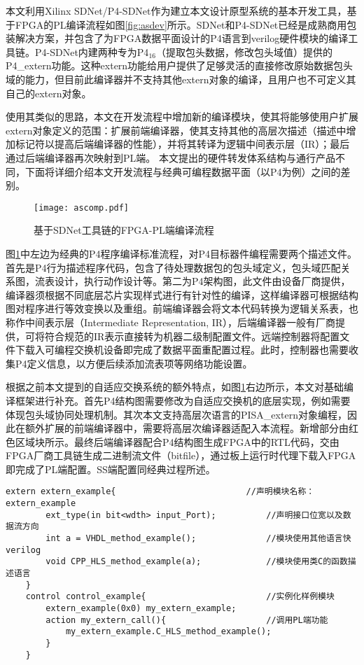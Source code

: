 本文利用Xilinx SDNet/P4-SDNet作为建立本文设计原型系统的基本开发工具，基于FPGA的PL编译流程如图\ref{fig:asdev}所示。SDNet和P4-SDNet已经是成熟商用包装解决方案，并包含了为FPGA数据平面设计的P4语言到verilog硬件模块的编译工具链。P4-SDNet内建两种专为P4$ _{16} $（提取包头数据，修改包头域值）提供的P4\_extern功能。这种extern功能给用户提供了足够灵活的直接修改原始数据包头域的能力，但目前此编译器并不支持其他extern对象的编译，且用户也不可定义其自己的extern对象。

使用其类似的思路，本文在开发流程中增加新的编译模块，使其将能够使用户扩展extern对象定义的范围：扩展前端编译器，使其支持其他的高层次描述（描述中增加标记符以提高后端编译器的性能），并将其转译为逻辑中间表示层（IR）；最后通过后端编译器再次映射到PL端。
本文提出的硬件转发体系结构与通行产品不同，下面将详细介绍本文开发流程与经典可编程数据平面（以P4为例）之间的差别。

\begin{figure}[!ht]
	\centering 
	\vspace{-1.5mm} 
	\texttt{[image: ascomp.pdf]}
	\caption{基于SDNet工具链的FPGA-PL端编译流程} \label{fig:ascomp}
\end{figure}

图\ref{fig:ascomp}中左边为经典的P4程序编译标准流程，对P4目标器件编程需要两个描述文件。首先是P4行为描述程序代码，包含了待处理数据包的包头域定义，包头域匹配关系图，流表设计，执行动作设计等。第二为P4架构图，此文件由设备厂商提供，编译器须根据不同底层芯片实现样式进行有针对性的编译，这样编译器可根据结构图对程序进行等效变换以及重组。前端编译器会将文本代码转换为逻辑关系表，也称作中间表示层（Intermediate Representation, IR），后端编译器一般有厂商提供，可将符合规范的IR表示直接转为机器二级制配置文件。远端控制器将配置文件下载入可编程交换机设备即完成了数据平面重配置过程。此时，控制器也需要收集P4定义信息，以方便后续添加流表项等网络功能设置。

根据之前本文提到的自适应交换系统的额外特点，如图\ref{fig:ascomp}右边所示，本文对基础编译框架进行补充。首先P4结构图需要修改为自适应交换机的底层实现，例如需要体现包头域协同处理机制。其次本文支持高层次语言的PISA\_extern对象编程，因此在额外扩展的前端编译器中，需要将高层次编译器适配入本流程。新增部分由红色区域块所示。最终后端编译器配合P4结构图生成FPGA中的RTL代码，交由FPGA厂商工具链生成二进制流文件（bitfile），通过板上运行时代理下载入FPGA即完成了PL端配置。SS端配置同经典过程所述。

\label{chap433}



{\fontsize{10pt}{0.5\baselineskip}\selectfont
	\begin{lstlisting}[caption={数据平面接口：PL端高层语言描述},label={ascode1}]
	extern extern_example{           				//声明模块名称：extern_example
		ext_type(in bit<wdth> input_Port);			//声明接口位宽以及数据流方向
		int a = VHDL_method_example();				//模块使用其他语言快verilog
		void CPP_HLS_method_example(a);				//模块使用类C的函数描述语言
	}
	control control_example{						//实例化样例模块
		extern_example(0x0) my_extern_example;
		action my_extern_call(){					//调用PL端功能
			my_extern_example.C_HLS_method_example();
		}
	}
	\end{lstlisting}
}


